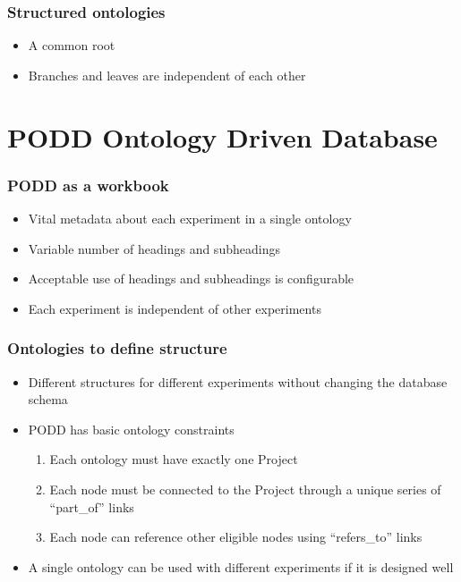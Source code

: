 \documentclass[12pt]{beamer}
\begin{document}
\begin{frame}
\frametitle{Structured ontologies}

\begin{itemize}
 \item A common root
\pause
 \item Branches and leaves are independent of each other
\end{itemize}
\end{frame}

\section{PODD Ontology Driven Database}

\begin{frame}
\frametitle{PODD as a workbook}

\begin{itemize}
 \item Vital metadata about each experiment in a single ontology
\pause
 \item Variable number of headings and subheadings
\pause
 \item Acceptable use of headings and subheadings is configurable
\pause
 \item Each experiment is independent of other experiments
\end{itemize}
\end{frame}

\begin{frame}
\frametitle{Ontologies to define structure}

\begin{itemize}
 \item Different structures for different experiments without changing the database schema
\pause
 \item PODD has basic ontology constraints
\begin{enumerate}
 \item Each ontology must have exactly one Project
 \item Each node must be connected to the Project through a unique series of ``part\_of'' links
 \item Each node can reference other eligible nodes using ``refers\_to'' links
\end{enumerate}
\pause
\item A single ontology can be used with different experiments if it is designed well
\end{itemize}
\end{frame}
\end{document}
